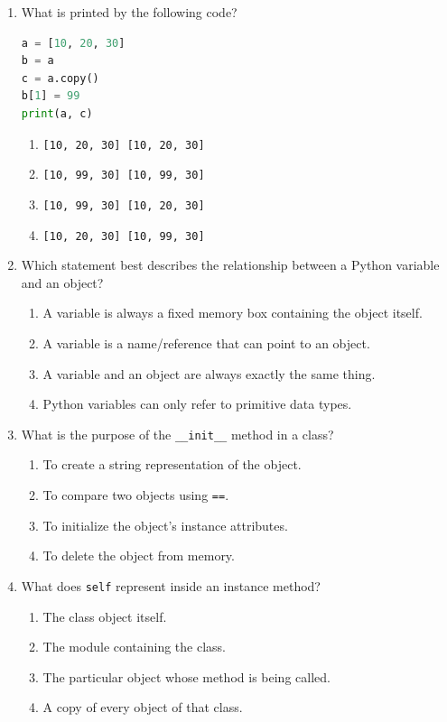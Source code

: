 \documentclass[12pt]{article}
\begin{document}
\begin{enumerate}[label=\arabic*.]

\item What is printed by the following code?
\begin{lstlisting}[language=Python]
a = [10, 20, 30]
b = a
c = a.copy()
b[1] = 99
print(a, c)
\end{lstlisting}
\begin{enumerate}[label=\Alph*.]
\item \texttt{[10, 20, 30] [10, 20, 30]}
\item \texttt{[10, 99, 30] [10, 99, 30]}
\item \texttt{[10, 99, 30] [10, 20, 30]}
\item \texttt{[10, 20, 30] [10, 99, 30]}
\end{enumerate}

\item Which statement best describes the relationship between a Python variable and an object?
\begin{enumerate}[label=\Alph*.]
\item A variable is always a fixed memory box containing the object itself.
\item A variable is a name/reference that can point to an object.
\item A variable and an object are always exactly the same thing.
\item Python variables can only refer to primitive data types.
\end{enumerate}

\item What is the purpose of the \texttt{\_\_init\_\_} method in a class?
\begin{enumerate}[label=\Alph*.]
\item To create a string representation of the object.
\item To compare two objects using \texttt{==}.
\item To initialize the object's instance attributes.
\item To delete the object from memory.
\end{enumerate}

\item What does \texttt{self} represent inside an instance method?
\begin{enumerate}[label=\Alph*.]
\item The class object itself.
\item The module containing the class.
\item The particular object whose method is being called.
\item A copy of every object of that class.
\end{enumerate}


\end{enumerate}
\end{document}
